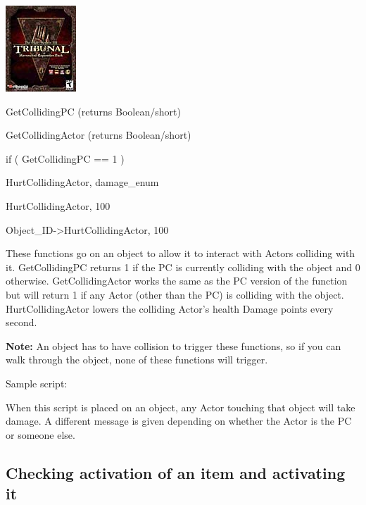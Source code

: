\documentclass[
]{article}
\begin{document}
\includegraphics{media/image6.png}

GetCollidingPC (returns Boolean/short)

GetCollidingActor (returns Boolean/short)

if ( GetCollidingPC == 1 )

HurtCollidingActor, damage\_enum

HurtCollidingActor, 100

Object\_ID-\textgreater HurtCollidingActor, 100

These functions go on an object to allow it to interact with Actors
colliding with it. GetCollidingPC returns 1 if the PC is currently
colliding with the object and 0 otherwise. GetCollidingActor works the
same as the PC version of the function but will return 1 if any Actor
(other than the PC) is colliding with the object. HurtCollidingActor
lowers the colliding Actor's health Damage points every second.

\textbf{Note:} An object has to have collision to trigger these
functions, so if you can walk through the object, none of these
functions will trigger.

Sample script:

When this script is placed on an object, any Actor touching that object
will take damage. A different message is given depending on whether the
Actor is the PC or someone else.



\hypertarget{section-3}{%
\subsection{}\label{section-3}}

\hypertarget{section-4}{%
\subsection{}\label{section-4}}

\hypertarget{checking-activation-of-an-item-and-activating-it}{%
\subsection{Checking activation of an item and activating
it}\label{checking-activation-of-an-item-and-activating-it}}
\end{document}
